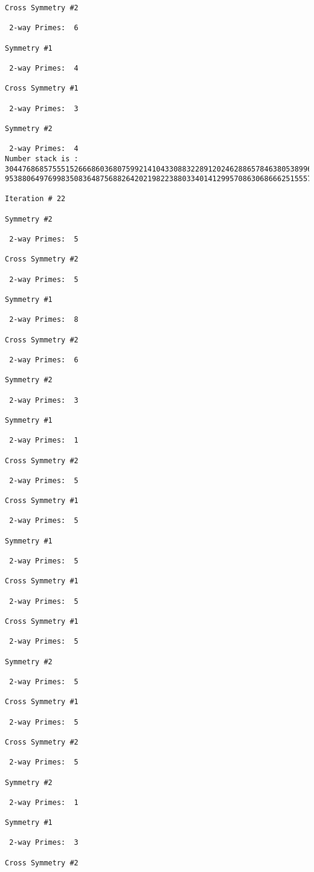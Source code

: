 \begin{verbatim}
Cross Symmetry #2

 2-way Primes: 	6

Symmetry #1

 2-way Primes: 	4

Cross Symmetry #1

 2-way Primes: 	3

Symmetry #2

 2-way Primes: 	4
Number stack is :
30447686857555152666860368075992141043308832289120246288657846380538996794608835958544046240163340857
95388064976998350836487568826420219822388033401412995708630686662515557586867440375804336104264044585

Iteration #	22

Symmetry #2

 2-way Primes: 	5

Cross Symmetry #2

 2-way Primes: 	5

Symmetry #1

 2-way Primes: 	8

Cross Symmetry #2

 2-way Primes: 	6

Symmetry #2

 2-way Primes: 	3

Symmetry #1

 2-way Primes: 	1

Cross Symmetry #2

 2-way Primes: 	5

Cross Symmetry #1

 2-way Primes: 	5

Symmetry #1

 2-way Primes: 	5

Cross Symmetry #1

 2-way Primes: 	5

Cross Symmetry #1

 2-way Primes: 	5

Symmetry #2

 2-way Primes: 	5

Cross Symmetry #1

 2-way Primes: 	5

Cross Symmetry #2

 2-way Primes: 	5

Symmetry #2

 2-way Primes: 	1

Symmetry #1

 2-way Primes: 	3

Cross Symmetry #2


\end{verbatim}
